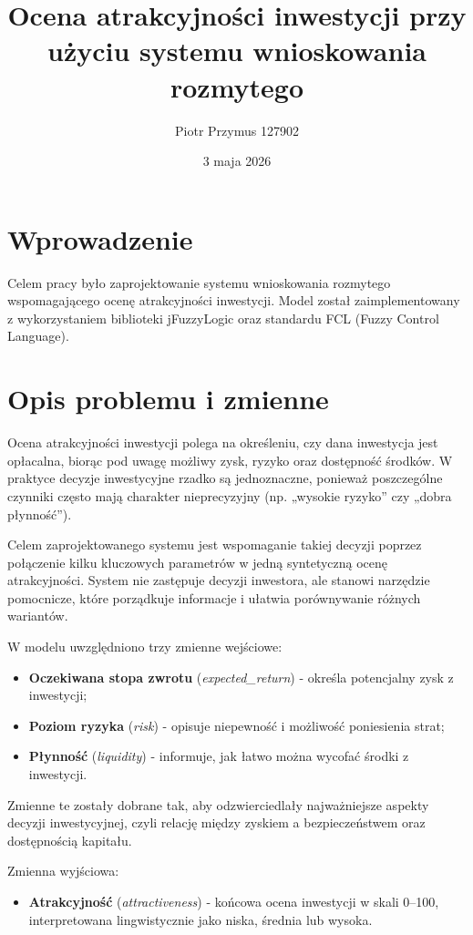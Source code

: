 \documentclass[11pt,a4paper]{article}
\title{Ocena atrakcyjności inwestycji przy użyciu systemu wnioskowania rozmytego}
\author{Piotr Przymus 127902}
\date{3 maja 2026}
\begin{document}
\maketitle

\section{Wprowadzenie}
Celem pracy było zaprojektowanie systemu wnioskowania rozmytego wspomagającego ocenę
atrakcyjności inwestycji. Model został zaimplementowany z wykorzystaniem biblioteki
jFuzzyLogic oraz standardu FCL (Fuzzy Control Language).

\section{Opis problemu i zmienne}
Ocena atrakcyjności inwestycji polega na określeniu, czy dana inwestycja jest opłacalna,
biorąc pod uwagę możliwy zysk, ryzyko oraz dostępność środków. W praktyce decyzje inwestycyjne
rzadko są jednoznaczne, ponieważ poszczególne czynniki często mają charakter nieprecyzyjny
(np. „wysokie ryzyko” czy „dobra płynność”).

Celem zaprojektowanego systemu jest wspomaganie takiej decyzji poprzez połączenie kilku
kluczowych parametrów w jedną syntetyczną ocenę atrakcyjności. System nie zastępuje
decyzji inwestora, ale stanowi narzędzie pomocnicze, które porządkuje informacje
i ułatwia porównywanie różnych wariantów.

W modelu uwzględniono trzy zmienne wejściowe:
\begin{itemize}
  \item \textbf{Oczekiwana stopa zwrotu} (\textit{expected\_return}) - określa potencjalny zysk z inwestycji;
  \item \textbf{Poziom ryzyka} (\textit{risk}) - opisuje niepewność i możliwość poniesienia strat;
  \item \textbf{Płynność} (\textit{liquidity}) - informuje, jak łatwo można wycofać środki z inwestycji.
\end{itemize}

Zmienne te zostały dobrane tak, aby odzwierciedlały najważniejsze aspekty decyzji inwestycyjnej,
czyli relację między zyskiem a bezpieczeństwem oraz dostępnością kapitału.

Zmienna wyjściowa:
\begin{itemize}
  \item \textbf{Atrakcyjność} (\textit{attractiveness}) - końcowa ocena inwestycji w skali 0--100,
  interpretowana lingwistycznie jako niska, średnia lub wysoka.
\end{itemize}
\end{document}
